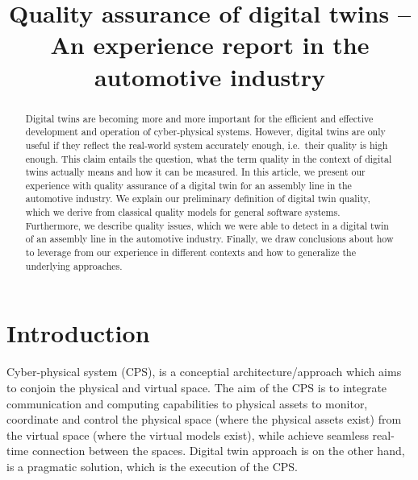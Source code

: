 \documentclass[conference]{IEEEtran}
\begin{document}
    \title{Quality assurance of digital twins -- An experience report in the automotive industry}
    \author{
        \and
    }
    \maketitle

    \begin{abstract}
        Digital twins are becoming more and more important for the efficient and effective development and operation of cyber-physical systems.
        However, digital twins are only useful if they reflect the real-world system accurately enough, i.e.\ their quality is high enough.
        This claim entails the question, what the term quality in the context of digital twins actually means and how it can be measured.
        In this article, we present our experience with quality assurance of a digital twin for an assembly line in the automotive industry.
        We explain our preliminary definition of digital twin quality, which we derive from classical quality models for general software systems.
        Furthermore, we describe quality issues, which we were able to detect in a digital twin of an assembly line in the automotive industry.
        Finally, we draw conclusions about how to leverage from our experience in different contexts and how to generalize the underlying approaches.
    \end{abstract}

    \section{Introduction}\label{section:introduction}
    Cyber-physical system (CPS), is a conceptial architecture/approach which aims to conjoin the physical and virtual space. 
    The aim of the CPS is to integrate communication and computing capabilities to physical assets to monitor, coordinate and control the physical space (where the physical assets exist)
    from the virtual space (where the virtual models exist), while achieve seamless real-time connection between the spaces.
    Digital twin approach is on the other hand, is a pragmatic solution, which is the execution of the CPS.\cite{TAO20193}
\end{document}
